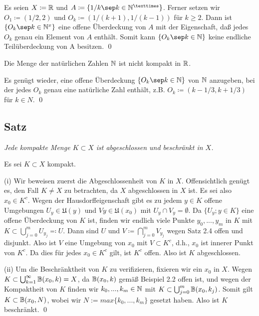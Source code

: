 \documentclass[a4paper,twoside]{book}
\begin{document}
\begin{Beweis0} Es seien $X \coloneqq \mathbb{R}$ und $A \coloneqq \{ 1/k \sep k \in \N^× \}$. Ferner setzen wir $O_1 \coloneqq (1/2, 2)$ und
$O_k \coloneqq (1/(k + 1), 1/(k - 1))$ für $k \ge 2$. Dann ist $\{ O_k \sep k \in \N^x\}$ eine offene Überdeckung von $A$ mit der Eigenschaft, daß jedes $O_k$ genau ein Element von $A$ enthält. 
Somit kann $\{ O_k \sep k \in \N\}$ keine endliche Teilüberdeckung von A besitzen. \qed\smallskip
\end{Beweis0} 

\noindent{}  Die Menge der natürlichen Zahlen $\mathbb{N}$ ist nicht kompakt in $\mathbb{R}$.

\begin{Beweis0} 
Es genügt wieder, eine offene Überdeckung $\{ O_k \sep k \in \N\}$ von $\mathbb{N}$ anzugeben, 
bei der jedes $O_k$ genau eine natürliche Zahl enthält, z.B. $O_k \coloneqq (k - 1/3, k + 1/3)$ für $k \in N$. \qed\smallskip
\end{Beweis0}

\subsection{Satz}  \textit{Jede kompakte Menge $K \subset X$ ist abgeschlossen und beschränkt in $X$.}\smallskip

\begin{Beweis}
Es sei $K \subset X$ kompakt.\smallskip

(i) Wir beweisen zuerst die Abgeschlossenheit von $K$ in $X$. Offensichtlich
genügt es, den Fall $K \neq X$ zu betrachten, da $X$ abgeschlossen in $X$ ist. Es sei
also $x_0 \in K^c$. Wegen der Hausdorffeigenschaft gibt es zu jedem $y \in K$ offene Umgebungen $U_y \in \mathfrak{U}(y)$ und $Vy \in \mathfrak{U}(x_0)$ mit $U_y \cap V_y = \emptyset$. Da $\{ U_y ; y \in K \}$ eine offene
Überdeckung von $K$ ist, finden wir endlich viele Punkte $y_0, . . . , y_m$ in $K$ mit
$K \subset \bigcup^m_{j=0} U_{y_j} \eqqcolon U$. Dann sind $U$ und $V \coloneqq \bigcap^m_{j=0} V_{y_j}$ wegen Satz 2.4 offen und
disjunkt. Also ist $V$ eine Umgebung von $x_0$ mit $V \subset K^c$, d.h., $x_0$ ist innerer Punkt
von $K^c$. Da dies für jedes $x_0 \in K^c$ gilt, ist $K^c$ offen. Also ist $K$ abgeschlossen.\smallskip

(ii) Um die Beschränktheit von $K$ zu verifizieren, fixieren wir ein $x_0$ in $X$.
Wegen $K \subset \bigcup^\infty_{k=1} \mathbb{B}(x_0, k) = X$, da $\mathbb{B}(x_0, k)$ gemäß Beispiel 2.2 offen ist, und wegen
der Kompaktheit von $K$ finden wir $k_0, . . . , k_m \in \mathbb{N}$ mit $K \subset \bigcup^m_{j=0} \mathbb{B}(x_0, k_j)$. Somit
gilt $K \subset \mathbb{B}(x_0,N)$, wobei wir $N := max\{k_0, . . . , k_m\}$ gesetzt haben. Also ist $K$
beschränkt. \qed
\end{Beweis}
\end{document}
